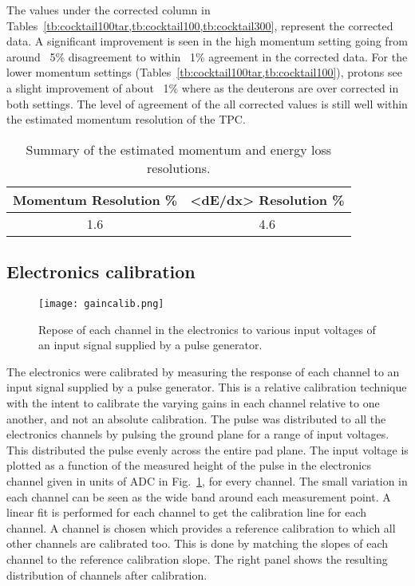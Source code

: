 The values under the corrected column in Tables~\cref{tb:cocktail100tar,tb:cocktail100,tb:cocktail300}, represent the corrected data. A significant improvement is seen in the high momentum setting going from around ~5\% disagreement to within ~1\% agreement in the corrected data. For the lower momentum settings (Tables~\cref{tb:cocktail100tar,tb:cocktail100}), protons see a slight improvement of about ~1\% where as the deuterons are over corrected in both settings. The level of agreement of the all corrected values is still well within the estimated momentum resolution of the TPC. 

\begin{table*}\centering
{}
\begin{tabular}{@{}cc@{}}\toprule
Momentum Resolution \% & <dE/dx> Resolution \% \\
\midrule
1.6  & 4.6\\
\bottomrule
\end{tabular}
\caption{Summary of the estimated momentum and energy loss resolutions.}
\label{tb:momresolution}
\end{table*}



\subsection{Electronics calibration}
\label{sec:elecCalib}

\begin{figure}[!htb]
\texttt{[image: gaincalib.png]}
\caption{Repose of each channel in the electronics to various input voltages of an input signal supplied by a pulse generator.}
\label{fig:gaincalib}
\end{figure}

The electronics were calibrated by measuring the response of each channel to an input signal supplied by a pulse generator. This is a relative calibration technique with the intent to calibrate the varying gains in each channel relative to one another, and not an absolute calibration. The pulse was distributed to all the electronics channels by pulsing the ground plane for a range of input voltages. This distributed the pulse evenly across the entire pad plane. The input voltage is plotted as a function of the measured height of the pulse in the electronics channel given in units of ADC in Fig.~\ref{fig:gaincalib}, for every channel. The small variation in each channel can be seen as the wide band around each measurement point. A linear fit is performed for each channel to get the calibration line for each channel. A channel is chosen which provides a reference calibration to which all other channels are calibrated too. This is done by matching the slopes of each channel to the reference calibration slope.  The right panel shows the resulting distribution of channels after calibration.



